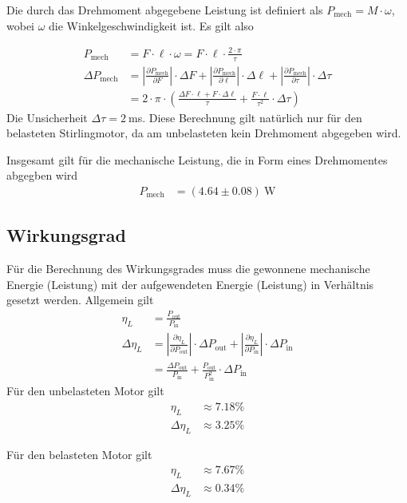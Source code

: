 \documentclass{article}
\begin{document}
Die durch das Drehmoment abgegebene Leistung ist definiert als $P_\text{mech} = M \cdot \omega$, wobei $\omega$ die Winkelgeschwindigkeit ist. Es gilt also

\begin{align}
P_\text{mech} &= F\cdot \ell \cdot \omega = F\cdot \ell \cdot \frac{2\cdot\pi}{\tau} \\
\Delta P_\text{mech} &= \left| \frac{\partial P_\text{mech}}{\partial F}\right|\cdot\Delta F + \left| \frac{\partial P_\text{mech}}{\partial \ell}\right|\cdot\Delta \ell + \left| \frac{\partial P_\text{mech}}{\partial \tau}\right|\cdot\Delta \tau \\
&= 2\cdot \pi\cdot \left( \frac{\Delta F \cdot \ell + F\cdot \Delta \ell}{\tau} +  \frac{F\cdot \ell}{\tau^2}\cdot\Delta\tau\right)
\end{align}
Die Unsicherheit $\Delta \tau=2~$ms. Diese Berechnung gilt natürlich nur für den belasteten Stirlingmotor, da am unbelasteten kein Drehmoment abgegeben wird.

Insgesamt gilt für die mechanische Leistung, die in Form eines Drehmomentes abgegben wird
\begin{align*}
P_\text{mech} &= (4.64 \pm 0.08)~\text{W}
\end{align*}


\subsection{Wirkungsgrad}

Für die Berechnung des  Wirkungsgrades muss die gewonnene mechanische Energie (Leistung) mit der aufgewendeten Energie (Leistung) in Verhältnis gesetzt werden. Allgemein gilt
\begin{align}
\eta_L &= \frac{P_\text{out}}{P_\text{in}} \\
\Delta \eta_L &= \left| \frac{\partial\eta_L}{\partial P_\text{out}} \right| \cdot \Delta P_\text{out} + \left| \frac{\partial\eta_L}{\partial P_\text{in}} \right| \cdot \Delta P_\text{in} \label{eq:wirk_1}\\
&= \frac{\Delta P_\text{out}}{ P_\text{in}} + \frac{P_\text{out}}{P^2_\text{in}}\cdot \Delta P_\text{in}\label{eq:wirk_2}
\end{align}
Für den unbelasteten Motor gilt
\begin{align*}
\eta_L &\approx 7.18\% \\
\Delta \eta_L &\approx 3.25\%
\end{align*}

Für den belasteten Motor gilt
\begin{align*}
\eta_L &\approx 7.67\% \\
\Delta \eta_L &\approx 0.34\%
\end{align*}
\end{document}
